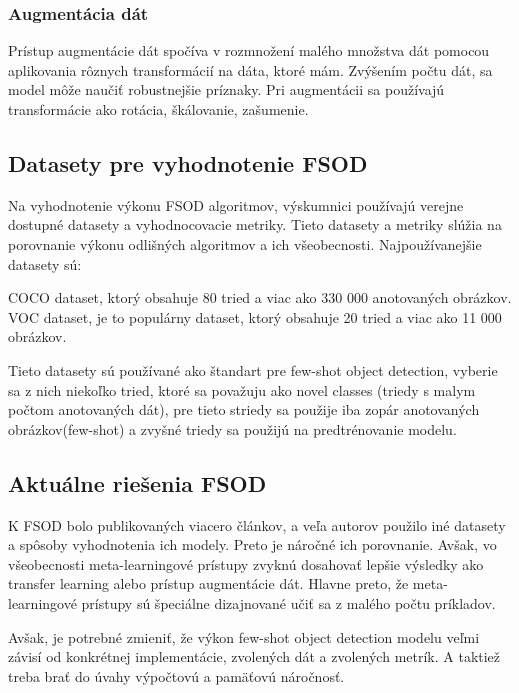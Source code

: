 \subsubsection{Augmentácia dát}
\hspace{\parindent}Prístup augmentácie dát spočíva v rozmnožení malého množstva dát pomocou aplikovania rôznych transformácií na dáta, ktoré mám. Zvýšením počtu dát, sa model môže naučiť robustnejšie príznaky. Pri augmentácii sa používajú transformácie ako rotácia, škálovanie, zašumenie. 

\subsection{Datasety pre vyhodnotenie FSOD}
\hspace{\parindent}Na vyhodnotenie výkonu FSOD algoritmov, výskumnici používajú verejne dostupné datasety a vyhodnocovacie metriky. Tieto datasety a metriky slúžia na porovnanie výkonu odlišných algoritmov a ich všeobecnosti. Najpoužívanejšie datasety sú: 

COCO dataset, ktorý obsahuje 80 tried a viac ako 330 000 anotovaných obrázkov. VOC dataset, je to populárny dataset, ktorý obsahuje 20 tried a viac ako 11 000 obrázkov. 

Tieto datasety sú používané ako štandart pre few-shot object detection, vyberie sa z nich niekoľko tried, ktoré sa považuju ako novel classes (triedy s malym počtom anotovaných dát), pre tieto striedy sa použije iba zopár anotovaných obrázkov(few-shot) a zvyšné triedy sa použijú na predtrénovanie modelu. 

\subsection{Aktuálne riešenia FSOD}
\hspace{\parindent}K FSOD bolo publikovaných viacero článkov, a veľa autorov použilo iné datasety a spôsoby vyhodnotenia ich modely. Preto je náročné ich porovnanie. Avšak, vo všeobecnosti meta-learningové prístupy zvyknú dosahovať lepšie výsledky ako transfer learning alebo prístup augmentácie dát. Hlavne preto, že meta-learningové prístupy sú špeciálne dizajnované učiť sa z malého počtu príkladov. 

Avšak, je potrebné zmieniť, že výkon few-shot object detection modelu veľmi závisí od konkrétnej implementácie, zvolených dát a zvolených metrík. A taktiež treba brať do úvahy výpočtovú a pamäťovú náročnosť. 